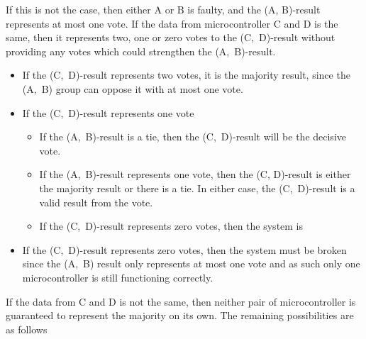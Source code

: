 If this is not the case, then either A or B is faulty, and the (A,
B)-result represents at most one vote. If the data from
microcontroller C and D is the same, then it represents two, one or
zero votes to the (C,~D)-result without providing any votes which
could strengthen the (A,~B)-result.

\begin{itemize}
\item If the (C,~D)-result represents two votes, it is the majority
  result, since the (A,~B) group can oppose it with at most one vote. 
  
\item If the (C,~D)-result represents one vote
  \begin{itemize}
  \item If the (A,~B)-result is a tie, then the (C,~D)-result will be
    the decisive vote. 
  \item If the (A,~B)-result represents one vote, then the (C,
    D)-result is either the majority result or there is a tie. In
    either case, the (C,~D)-result is a valid result from the vote.
  \item If the (C,~D)-result represents zero votes, then the system is
  \end{itemize}

\item If the (C,~D)-result represents zero votes, then the system must
  be broken since the (A,~B) result only represents at most one vote
  and as such only one microcontroller is still functioning correctly.
\end{itemize}

If the data from C and D is not the same, then neither pair of
microcontroller is guaranteed to represent the majority on its
own. The remaining possibilities are as follows

